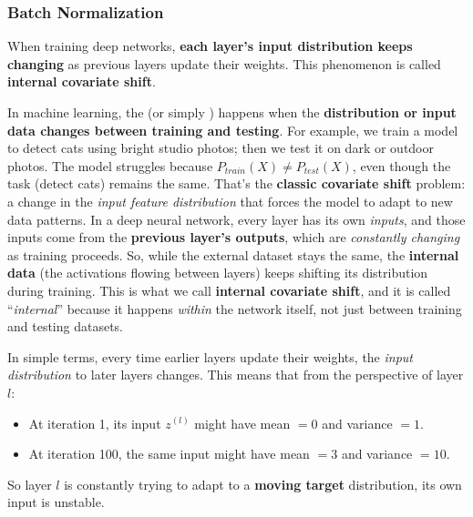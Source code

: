 \subsubsection{Batch Normalization}\label{sec:batch-normalization}

When training deep networks, \textbf{each layer's input distribution keeps changing} as previous layers update their weights. This phenomenon is called \textbf{internal covariate shift}.

\highspace
In machine learning, the  (or simply ) happens when the \textbf{distribution or input data changes between training and testing}. For example, we train a model to detect cats using bright studio photos; then we test it on dark or outdoor photos. The model struggles because $P_{train}(X) \neq P_{test}(X)$, even though the task (detect cats) remains the same. That's the \textbf{classic covariate shift} problem: a change in the \emph{input feature distribution} that forces the model to adapt to new data patterns. In a deep neural network, every layer has its own \emph{inputs}, and those inputs come from the \textbf{previous layer's outputs}, which are \emph{constantly changing} as training proceeds. So, while the external dataset stays the same, the \textbf{internal data} (the activations flowing between layers) keeps shifting its distribution during training. This is what we call \textbf{internal covariate shift}, and it is called ``\emph{internal}'' because it happens \emph{within} the network itself, not just between training and testing datasets.

\highspace
In simple terms, every time earlier layers update their weights, the \emph{input distribution} to later layers changes. This means that from the perspective of layer $l$:
\begin{itemize}
    \item At iteration 1, its input $z^{(l)}$ might have mean $=0$ and variance $=1$.
    \item At iteration 100, the same input might have mean $=3$ and variance $=10$.
\end{itemize}
So layer $l$ is constantly trying to adapt to a \textbf{moving target} distribution, its own input is unstable.

